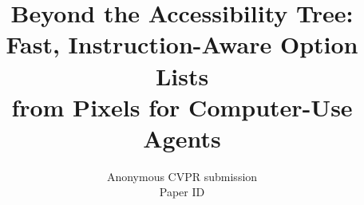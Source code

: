 \documentclass[10pt,twocolumn,letterpaper]{article}
\title{Beyond the Accessibility Tree: Fast, Instruction-Aware Option Lists\\from Pixels for Computer-Use Agents}
\author{Anonymous CVPR submission\\Paper ID \paperID}
\begin{document}
\maketitle






{
    \small
    
    
}

\end{document}
